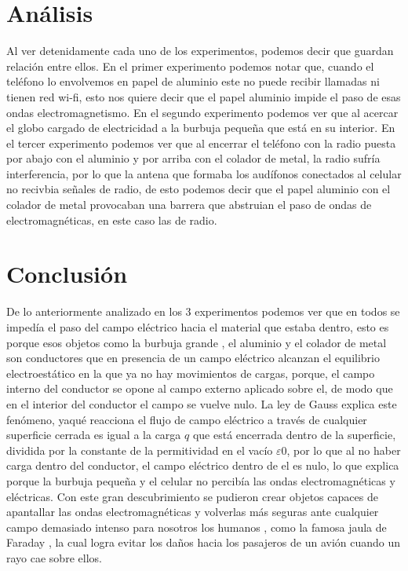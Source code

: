 \documentclass[a4paper,12pt]{article}
\begin{document}
\section*{Análisis}
Al ver detenidamente cada uno de los experimentos, podemos decir que guardan relación entre ellos.
En el primer experimento podemos notar que, cuando el teléfono lo envolvemos en papel de aluminio este no puede recibir llamadas ni tienen red wi-fi, esto nos quiere decir que el papel aluminio impide el paso de esas ondas electromagnetismo.
En el segundo experimento podemos ver que al acercar el globo cargado de electricidad a la burbuja pequeña que está en su interior.
En el tercer experimento podemos ver que al encerrar el teléfono con la radio puesta por abajo con el aluminio y por arriba con el colador de metal, la radio sufría interferencia, por lo que la antena que formaba los audífonos conectados al celular no recivbia señales de radio, de esto podemos decir que el papel aluminio con el colador de metal provocaban una barrera que abstruian el paso de ondas de electromagnéticas, en este caso las de radio.


\section*{Conclusión}
De lo anteriormente analizado en los 3 experimentos podemos ver que en todos se impedía el paso del campo eléctrico hacia el material que estaba dentro, esto es porque esos objetos como la burbuja grande , el aluminio y el colador de metal son conductores que en presencia de un campo eléctrico alcanzan el equilibrio electroestático en la que ya no hay movimientos de cargas, porque, el campo interno del conductor se opone al campo externo aplicado sobre el, de modo que en el interior del conductor el campo se vuelve nulo.
La ley de Gauss explica este fenómeno, yaqué reacciona el flujo de campo eléctrico a través de cualquier superficie cerrada es igual a la carga $q$ que está encerrada dentro de la superficie, dividida por la constante de la permitividad en el vacío $ε 0$, por lo que al no haber carga dentro del conductor, el campo eléctrico dentro de el es nulo, lo que explica porque la burbuja pequeña y el celular no percibía las ondas electromagnéticas y eléctricas.
Con este gran descubrimiento se pudieron crear objetos capaces de apantallar las ondas electromagnéticas y volverlas más seguras ante cualquier campo demasiado intenso para nosotros los humanos , como la famosa jaula de Faraday , la cual logra evitar los daños hacia los pasajeros de un avión cuando un rayo cae sobre ellos.

\end{document}
